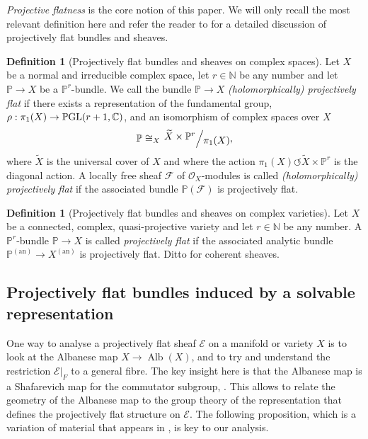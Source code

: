 \documentclass[JEP,XML,SOM,Unicode,published]{cedram}
\let\scr\mathscr
\newcommand{\an}{\mathrm{an}}
\theoremstyle{plain}
\theoremstyle{definition}
\newtheorem{defn}[thm]{Definition}
\numberwithin{equation}{thm}
\numberwithin{enumi}{thm}
\DeclareMathOperator{\Alb}{Alb}
\DeclareMathOperator{\GL}{GL}
\newcommand{\sE}{\scr{E}}
\newcommand{\sF}{\scr{F}}
\newcommand{\sO}{\scr{O}}
\newcommand{\bC}{\mathbb{C}}
\newcommand{\bN}{\mathbb{N}}
\newcommand{\bP}{\mathbb{P}}
\let\wtilde\widetilde
\newcommand{\factor}[2]{\left. \raise 2pt\hbox{$#1$} \right/\hskip -2pt\raise -2pt\hbox{$#2$}}
\begin{document}
\emph{Projective flatness} is the core notion of this paper. We will only
recall the most relevant definition here and refer the reader to
\cite[\S 3]{GKP20a} for a detailed discussion of projectively flat bundles
and sheaves.

\begin{defn}[Projectively flat bundles and sheaves on complex spaces]\label{def:3-2}
Let $X$ be a normal and irreducible complex space, let $r \in \bN$ be any number
and let $\bP \to X$ be a $\bP^r$-bundle. We call the bundle $\bP \to X$
\emph{(holomorphically) projectively flat} if there exists a representation of
the fundamental group, $\rho : \pi_1(X) \to \bP\negthinspace\GL(r+1,\bC)$, and an
isomorphism of complex spaces over $X$
\[
\bP \cong_X \factor{\wtilde{X} \times \bP^r}{\pi_1(X)},
\]
where $\wtilde{X}$ is the universal cover of $X$ and where the action
$\pi_1(X) \circlearrowleft \wtilde{X} \times \bP^r$ is the diagonal action. A locally free sheaf $\sF$
of $\sO_X$-modules is called \emph{(holomorphically) projectively flat} if the
associated bundle $\bP(\sF)$ is projectively flat.
\end{defn}

\begin{defn}[Projectively flat bundles and sheaves on complex varieties]
Let $X$ be a connected, complex, quasi-projective variety and let $r \in \bN$ be
any number. A $\bP^r$-bundle $\bP \to X$ is called \emph{projectively flat} if the
associated analytic bundle $\bP^{(\an)} \to X^{(\an)}$ is projectively flat. Ditto
for coherent sheaves.
\end{defn}

\subsection{Projectively flat bundles induced by a solvable representation}

One way to analyse a projectively flat sheaf $\sE$ on a manifold or variety $X$ is
to look at the Albanese map $X \to \Alb(X)$, and to try and understand the
restriction $\sE|_F$ to a general fibre. The key insight here is that the
Albanese map is a Shafarevich map for the commutator subgroup,
\cite[Prop.\,4.3]{Kollar93}. This allows to relate the geometry of the Albanese
map to the group theory of the representation that defines the projectively flat
structure on $\sE$. The following proposition, which is a variation of material
that appears in \cite{MR3030068}, is key to our analysis.
\end{document}
